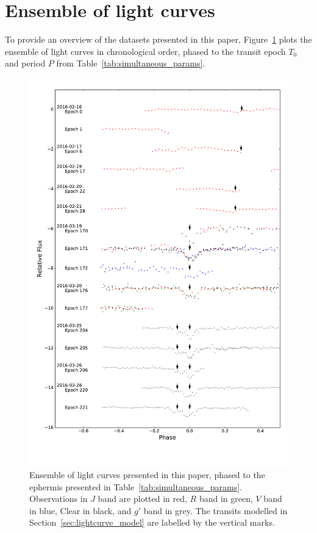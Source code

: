 \documentclass[useAMS,usenatbib]{mn2e}
\begin{document}
\appendix
\section{Ensemble of light curves}
\label{sec:lc_all}


To provide an overview of the datasets presented in this paper, Figure~\ref{fig:lc_all} plots the ensemble of light curves in chronological order, phased to the transit epoch $T_0$ and period $P$ from Table~\ref{tab:simultaneous_params}.

\begin{figure}
    \centering
    \includegraphics[width=15cm]{plots/lc_all.pdf}
    \caption{\label{fig:lc_all}Ensemble of light curves presented in this paper, phased to the ephermis presented in Table~\ref{tab:simultaneous_params}. Observations in $J$ band are plotted in red, $R$ band in green, $V$ band in blue, Clear in black, and $g'$ band in grey. The transits modelled in Section~\ref{sec:lightcurve_model} are labelled by the vertical marks.}
\end{figure}
\end{document}
